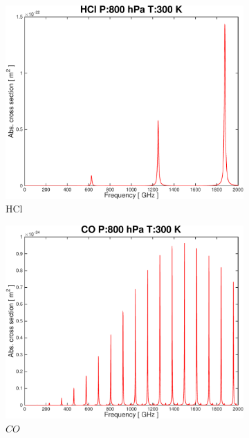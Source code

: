 \documentclass[paper=a4, fontsize=11pt]{scrartcl}
\begin{document}
\begin{figure}[t!]
    \centering
    \begin{subfigure}[t]{0.45\textwidth}
        \includegraphics[width=\textwidth]{plots/plot_xsec_HCl_800hPa_300K.pdf}
        \caption{HCl}
    \end{subfigure}
    \begin{subfigure}[t]{0.45\textwidth}
        \includegraphics[width=\textwidth]{plots/plot_xsec_CO_800hPa_300K.pdf}
        \caption{$CO$}
    \end{subfigure}
    \begin{subfigure}[b]{0.45\textwidth}

\end{subfigure}
\end{figure}
\end{document}
